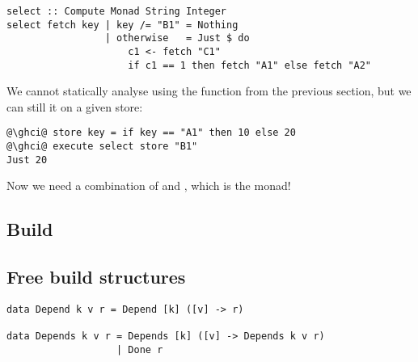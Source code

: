 \vspace{1mm}
\begin{verbatim}
select :: Compute Monad String Integer
select fetch key | key /= "B1" = Nothing
                 | otherwise   = Just $ do
                     c1 <- fetch "C1"
                     if c1 == 1 then fetch "A1" else fetch "A2"
\end{verbatim}
\vspace{1mm}

We cannot statically analyse  using the function 
from the previous section, but we can still  it on a given store:

\vspace{1mm}
\begin{verbatim}
@\ghci@ store key = if key == "A1" then 10 else 20
@\ghci@ execute select store "B1"
Just 20
\end{verbatim}
\vspace{1mm}


Now we need a combination of  and , which is the
 monad!

\subsection{Build}\label{sec-general-build}


\subsection{Free build structures}\label{sec-free-build}

\begin{verbatim}
data Depend k v r = Depend [k] ([v] -> r)

data Depends k v r = Depends [k] ([v] -> Depends k v r)
                   | Done r
\end{verbatim}
